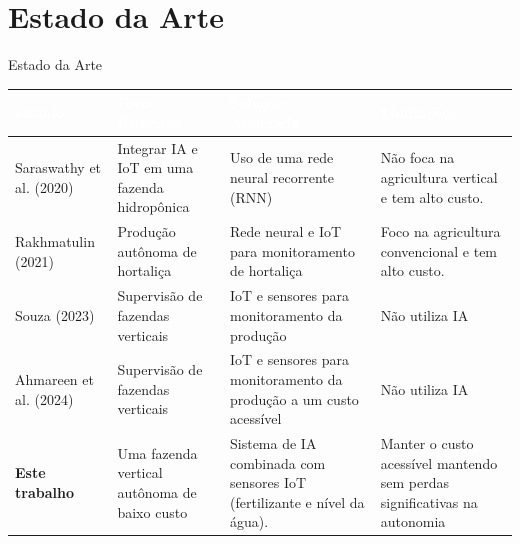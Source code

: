 \documentclass[10pt]{beamer}
\begin{document}
\section{Estado da Arte}
\begin{frame}{Estado da Arte}

\renewcommand{\arraystretch}{1.5}
\scriptsize

\begin{table}[h!]
\centering
{}

\begin{tabularx}{0.98\linewidth}{|>{\raggedright\arraybackslash}p{2.3cm}|
                                  >{\raggedright\arraybackslash}X|
                                  >{\raggedright\arraybackslash}X|
                                  >{\raggedright\arraybackslash}X|}
\hline
\rowcolor{cpsvermelho!90}
\textbf{\textcolor{white}{Estudo}} &
\textbf{\textcolor{white}{Foco Principal}} &
\textbf{\textcolor{white}{Soluções Apontadas}} &
\textbf{\textcolor{white}{Limitações}} \\ \hline

Saraswathy et al. (2020) &
Integrar IA e IoT em uma fazenda hidropônica &
Uso de uma rede neural recorrente (RNN) &
Não foca na agricultura vertical e tem alto custo. \\ \hline

Rakhmatulin (2021)  &
Produção autônoma de hortaliça &
Rede neural e IoT para monitoramento de hortaliça &
Foco na agricultura convencional e tem alto custo. \\ \hline

Souza (2023)  &
Supervisão de fazendas verticais &
IoT e sensores para monitoramento da produção &
Não utiliza IA \\ \hline

Ahmareen et al. (2024)  &
Supervisão de fazendas verticais &
IoT e sensores para monitoramento da produção a um custo acessível &
Não utiliza IA \\ \hline

\textbf{Este trabalho} &
Uma fazenda vertical autônoma de baixo custo &
Sistema de IA combinada com sensores IoT (fertilizante e nível da água). &
Manter o custo acessível mantendo sem perdas significativas na autonomia\\ \hline

\end{tabularx}
\end{table}

\end{frame}
\end{document}
